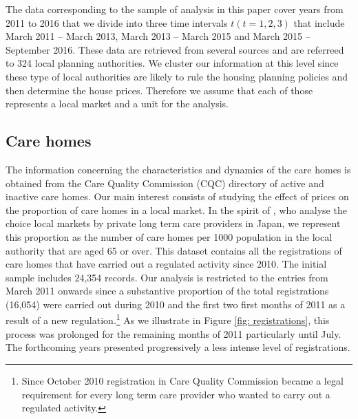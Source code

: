 \documentclass[12pt,letterpaper]{article}
\begin{document}
  The data corresponding to  the sample of analysis in this paper cover years from 2011 to 2016 
  that we divide into three time intervals $t  (t = 1, 2, 3)$ that include March 2011 – March 2013, 
  March 2013 – March 2015 and March 2015 – September 2016. These data are 
  retrieved from several sources and are referreed to 324 local planning 
  authorities. We cluster our information at this level since these type of local authorities are likely to rule the housing planning policies and then 
  determine the house prices.  Therefore we assume that each of those represents a local market and
  a unit for the analysis. 
  
  \subsection*{Care homes}
  \label{sec: care homes}
  
  
 The information concerning the characteristics and dynamics of the
care homes is obtained from the Care Quality Commission (CQC) directory of active and inactive 
care homes. Our main interest consists of studying the effect of prices on the proportion of care homes 
in a local market. In the spirit of \citet{tokunaga2013factors}, who analyse
 the choice local markets by private long term care providers in Japan, we represent this proportion as the number
  of care homes per 1000 population in the local authority that
 are aged 65 or over. This dataset contains all the registrations of care homes that have carried out a regulated activity since
   2010. The initial sample includes 24,354 records. Our analysis is restricted to the entries from March
    2011 onwards since a substantive proportion of the total registrations (16,054) were 
     carried out during 2010 and the first two first months of 2011 as a result 
     of a new regulation.\footnote{Since October 2010 registration in Care Quality Commission  became a legal requirement for every long 
     term care provider who wanted to carry out a regulated activity.} As we illustrate in Figure \ref{fig: registrations}, this process 
     was prolonged for the remaining months of 2011 particularly until July. The forthcoming years presented  
     progressively a less intense level of registrations.
     
\end{document}
